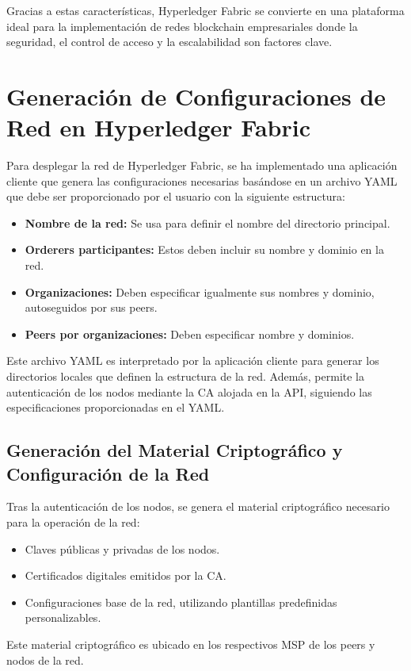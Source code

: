 Gracias a estas características, Hyperledger Fabric se convierte en una plataforma ideal para la implementación de redes blockchain empresariales donde la seguridad, el control de acceso y la escalabilidad son factores clave.

\section{Generación de Configuraciones de Red en Hyperledger Fabric}
Para desplegar la red de Hyperledger Fabric, se ha implementado una aplicación cliente que genera las configuraciones necesarias basándose en un archivo YAML\cite{yaml} que debe ser proporcionado por el usuario con la siguiente estructura:

\begin{itemize}
    \item \textbf{Nombre de la red:} Se usa para definir el nombre del directorio principal.
    \item \textbf{Orderers participantes:} Estos deben incluir su nombre y dominio en la red.
    \item \textbf{Organizaciones:} Deben especificar igualmente sus nombres y dominio, autoseguidos por sus peers.
    \item \textbf{Peers por organizaciones:} Deben especificar nombre y dominios.
\end{itemize}

Este archivo YAML es interpretado por la aplicación cliente para generar los directorios locales que definen la estructura de la red. Además, permite la autenticación de los nodos mediante la CA alojada en la API, siguiendo las especificaciones proporcionadas en el YAML.

\subsection{Generación del Material Criptográfico y Configuración de la Red}
Tras la autenticación de los nodos, se genera el material criptográfico necesario para la operación de la red:
\begin{itemize}
    \item Claves públicas y privadas de los nodos.
    \item Certificados digitales emitidos por la CA.
    \item Configuraciones base de la red, utilizando plantillas predefinidas personalizables.
\end{itemize}
Este material criptográfico es ubicado en los respectivos MSP de los peers y nodos de la red.

